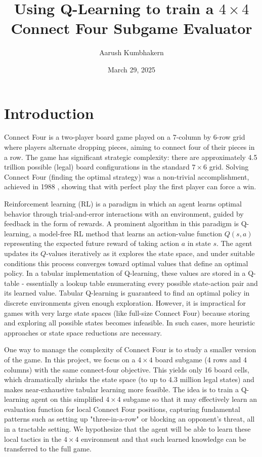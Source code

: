 \documentclass[10pt]{extarticle}
\title{Using Q-Learning to train a $4 \times 4$ Connect Four Subgame Evaluator}
\author{Aarush Kumbhakern}
\date{March 29, 2025}
\begin{document}
\sloppy
\maketitle

\section{Introduction}

Connect Four is a two-player board game played on a 7-column by 6-row grid where players alternate dropping pieces, aiming to connect four of their pieces in a row. The game has significant strategic complexity: there are approximately 4.5 trillion possible (legal) board configurations in the standard $7 \times 6$ grid. Solving Connect Four (finding the optimal strategy) was a non-trivial accomplishment, achieved in 1988 \cite{Wiki2025}, showing that with perfect play the first player can force a win.

Reinforcement learning (RL) is a paradigm in which an agent learns optimal behavior through trial-and-error interactions with an environment, guided by feedback in the form of rewards. A prominent algorithm in this paradigm is Q-learning, a model-free RL method that learns an action-value function $Q(s,a)$ representing the expected future reward of taking action $a$ in state $s$. The agent updates its $Q$-values iteratively as it explores the state space, and under suitable conditions this process converges toward optimal values that define an optimal policy. In a tabular implementation of Q-learning, these values are stored in a Q-table - essentially a lookup table enumerating every possible state-action pair and its learned value. Tabular Q-learning is guaranteed to find an optimal policy in discrete environments given enough exploration. However, it is impractical for games with very large state spaces (like full-size Connect Four) because storing and exploring all possible states becomes infeasible. In such cases, more heuristic approaches or state space reductions are necessary.

One way to manage the complexity of Connect Four is to study a smaller version of the game. In this project, we focus on a $4 \times 4$ board subgame (4 rows and 4 columns) with the same connect-four objective. This yields only 16 board cells, which dramatically shrinks the state space (to up to 4.3 million legal states) and makes near-exhaustive tabular learning more feasible. The idea is to train a Q-learning agent on this simplified $4 \times 4$ subgame so that it may effectively learn an evaluation function for local Connect Four positions, capturing fundamental patterns such as setting up "three-in-a-row" or blocking an opponent's threat, all in a tractable setting. We hypothesize that the agent will be able to learn these local tactics in the $4 \times 4$ environment and that such learned knowledge can be transferred to the full game.
\end{document}
